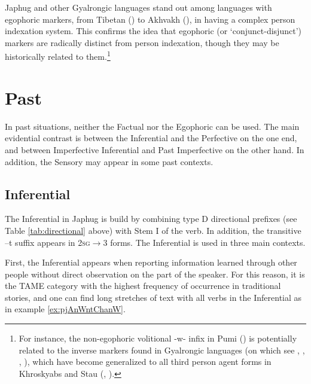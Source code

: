 \documentclass[oldfontcommands,oneside,a4paper,11pt]{article}
\newcommand{\ipa}[1]{{\phon \mbox{#1}}} %
\begin{document}
Japhug and other Gyalrongic languages stand out among languages with egophoric markers, from Tibetan (\citealt{tournadre08conjunct}) to Akhvakh (\citealt{creissels08akhvakh}), in having  a complex person indexation system. This confirms the idea that egophoric (or `conjunct-disjunct') markers are radically distinct from person indexation, though they may be historically related to them.\footnote{For instance, the non-egophoric volitional \ipa{-w-} infix in Pumi (\citealt{daudey14volition}) is potentially related to the inverse markers found in Gyalrongic languages (on which see \citealt{delancey81direction}, \citealt{jackson02rentongdengdi}, \citealt{jacques10inverse}, \citealt{gongxun14agreement}), which have become generalized to all third person agent forms in Khroskyabs and Stau (\citealt{jacques14rtau}, \citealt{lai14person}).}

 
\section{Past} \label{sec:evd:pst}
In past situations, neither the Factual nor the Egophoric  can be used. The main evidential contrast is between the Inferential and the Perfective on the one end, and between Imperfective Inferential and Past Imperfective on the other hand. In addition, the Sensory may appear in some past contexts.


\subsection{Inferential}  \label{sec:ifr}
The Inferential in Japhug is build by combining type D directional prefixes (see Table \ref{tab:directional} above) with Stem I of the verb. In addition, the transitive \ipa{--t} suffix appears in \textsc{2sg}$\rightarrow$3 forms. The Inferential is used in three main contexts. 


First, the Inferential appears when reporting information learned through other people without direct observation on the part of the speaker. For this reason, it is the TAME category with the highest frequency of occurrence in traditional stories, and one can find long stretches of text with all verbs in the Inferential as in example \ref{ex:pjAnWntChanW}.
\end{document}
